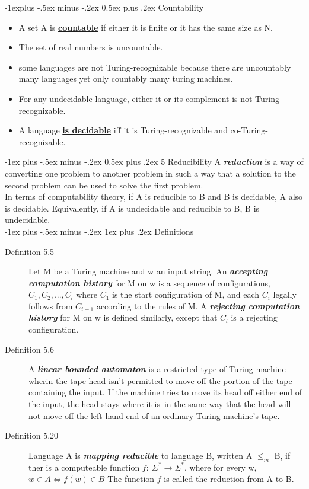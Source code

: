 \documentclass[10pt,landscape]{article}
\makeatletter
\renewcommand{\section}{\@startsection{section}{1}{0mm}%
                                {-1ex plus -.5ex minus -.2ex}%
                                {0.5ex plus .2ex}%
                                {\normalfont\large\bfseries}}
\renewcommand{\subsection}{\@startsection{subsection}{2}{0mm}%
                                {-1explus -.5ex minus -.2ex}%
                                {0.5ex plus .2ex}%
                                {\normalfont\normalsize\bfseries}}
\renewcommand{\subsubsection}{\@startsection{subsubsection}{3}{0mm}%
                                {-1ex plus -.5ex minus -.2ex}%
                                {1ex plus .2ex}%
                                {\normalfont\small\bfseries}}
\makeatother
\begin{document}
\begin{multicols}{3}
\subsection{Countability}
\begin{itemize}
	\item A set A is \underline{\textbf{countable}} if either it is finite or it has the same size as N.
	\item The set of real numbers is uncountable.
	\item some languages are not Turing-recognizable because there are uncountably many languages yet only countably many turing machines.
	\item For any undecidable language, either it or its complement is not Turing-recognizable.
	\item A language \underline{\textbf{is decidable}} iff it is Turing-recognizable and co-Turing-recognizable.
\end{itemize}

\section{5 Reducibility}
A \textbf{\textit{reduction}} is a way of converting one problem to another problem in such a way that a solution to the second problem can be used to solve the first problem.\\
In terms of computability theory, if A is reducible to B and B is decidable, A also is decidable. Equivalently, if A is undecidable and reducible to B, B is undecidable. \\

\subsubsection{Definitions}
\begin{description}
  \item[Definition 5.5] Let M be a Turing machine and w an input string. An \textbf{\textit{accepting computation history}} for M on w is a sequence of configurations, $C_{1},C_{2},...,C_{l}$ where $C_{1}$ is the start configuration of M, and each $C_{i}$ legally follows from $C_{i-1}$ according to the rules of M. A \textbf{\textit{rejecting computation history}} for M on w is defined similarly, except that $C_{l}$ is a rejecting configuration.
  \item[Definition 5.6] A \textbf{\textit{linear bounded automaton}} is a restricted type of Turing machine wherin the tape head isn't permitted to move off the portion of the tape containing the input. If the machine tries to move its head off either end of the input, the head stays where it is--in the same way that the head will not move off the left-hand end of an ordinary Turing machine's tape.
  \item[Definition 5.20] Language A is \textbf{\textit{mapping reducible}} to language B, written A $\leq_{m}$ B, if ther is a computeable function $f:\ \Sigma^{*} \rightarrow \Sigma^{*}$, where for every w, $w \in A \Longleftrightarrow f(w) \in B$ The function $f$ is called the reduction from A to B.
\end{description}


\end{multicols}
\end{document}
